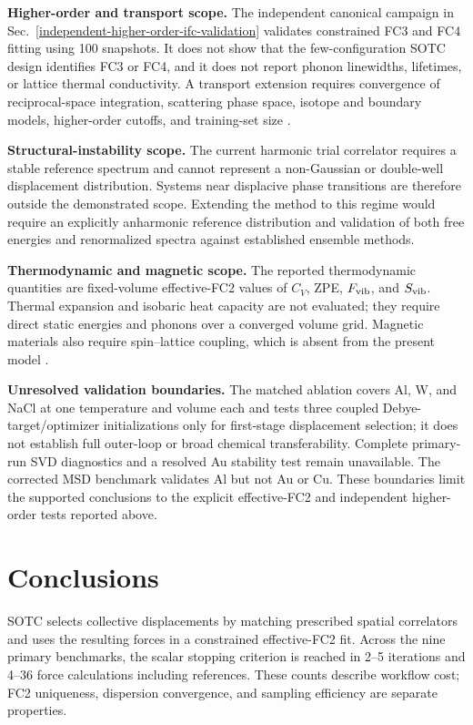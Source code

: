 \documentclass[aps,prb,reprint,amsmath,amssymb,floatfix]{revtex4-2}
\begin{document}
\color{revisionblue}
\textbf{Higher-order and transport scope.} The independent canonical campaign
in Sec.~\ref{independent-higher-order-ifc-validation} validates constrained FC3
and FC4 fitting using 100 snapshots. It does not show that the
few-configuration SOTC design identifies FC3 or FC4, and it does not report
phonon linewidths, lifetimes, or lattice thermal conductivity. A transport
extension requires convergence of reciprocal-space integration, scattering
phase space, isotope and boundary models, higher-order cutoffs, and training-set
size \cite{ref40}.
\color{black}

\color{revisionblue}
\textbf{Structural-instability scope.} The current harmonic trial correlator
requires a stable reference spectrum and cannot represent a non-Gaussian or
double-well displacement distribution. Systems near displacive phase
transitions are therefore outside the demonstrated scope. Extending the method
to this regime would require an explicitly anharmonic reference distribution
and validation of both free energies and renormalized spectra against
established ensemble methods.
\color{black}

\color{revisionblue}
\textbf{Thermodynamic and magnetic scope.} The reported thermodynamic quantities
are fixed-volume effective-FC2 values of \(C_V\), ZPE, \(F_{\rm vib}\), and
\(S_{\rm vib}\). Thermal expansion and isobaric heat capacity are not evaluated;
they require direct static energies and phonons over a converged volume grid.
Magnetic materials also require spin--lattice coupling, which is absent from the
present model \cite{ref41}.
\color{black}

\color{revisionblue}
\textbf{Unresolved validation boundaries.} The matched ablation covers Al, W,
and NaCl at one temperature and volume each and tests three coupled
Debye-target/optimizer initializations only for first-stage displacement
selection; it does not establish full outer-loop or broad chemical
transferability. Complete primary-run SVD diagnostics and a resolved Au
stability test remain unavailable. The corrected MSD benchmark validates Al
but not Au or Cu. These boundaries limit the supported conclusions to the
explicit effective-FC2 and independent higher-order tests reported above.
\color{black}

\section{Conclusions}\label{conclusions}

\color{revisionblue}
SOTC selects collective displacements by matching prescribed spatial
correlators and uses the resulting forces in a constrained effective-FC2 fit.
Across the nine primary benchmarks, the scalar stopping criterion is reached in
2--5 iterations and 4--36 force calculations including references. These
counts describe workflow cost; FC2 uniqueness, dispersion convergence, and
sampling efficiency are separate properties.
\color{black}
\end{document}
